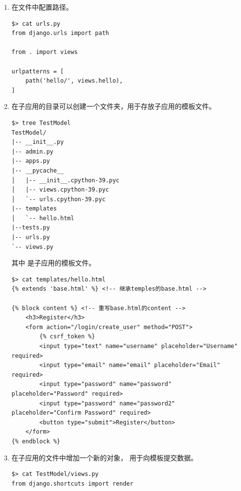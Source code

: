 \begin{enumerate}[label=\arabic*)]
\begin{lstlisting}[style=demostyle, numbers=none]
<body>
    <h2>美使馆</h2>
    {% block content %}
    {% endblock %}
</body> 

<footer>
    <small>&copy 2020 美使馆<a href="http://www.baidu.com">JJW</a></small>
</footer>

</html>
\end{lstlisting}

  \item 在文件中配置路径。
\begin{lstlisting}[style=demostyle,numbers=none]
$> cat urls.py
from django.urls import path
 
from . import views
 
urlpatterns = [
    path('hello/', views.hello),
]
\end{lstlisting}

\item 在\textcolor{YBXPurple}{子应用}的目录可以创建一个文件夹，用于存放子应用的模板文件。
\begin{lstlisting}[style=demostyle,numbers=none]
$> tree TestModel
TestModel/
|-- __init__.py
|-- admin.py
|-- apps.py
|-- __pycache__
│   |-- __init__.cpython-39.pyc
│   |-- views.cpython-39.pyc
│   `-- urls.cpython-39.pyc
|-- templates
│   `-- hello.html
|--tests.py
|-- urls.py
`-- views.py
\end{lstlisting}  

其中  是子应用的模板文件。
\begin{lstlisting}[style=demostyle,numbers=none]
$> cat templates/hello.html
{% extends 'base.html' %} <!-- 继承temples的base.html -->

{% block content %} <!-- 重写base.html的content -->
    <h3>Register</h3>
    <form action="/login/create_user" method="POST">
        {% csrf_token %}
        <input type="text" name="username" placeholder="Username" required>
        <input type="email" name="email" placeholder="Email" required>
        <input type="password" name="password" placeholder="Password" required>
        <input type="password" name="password2" placeholder="Confirm Password" required>
        <button type="submit">Register</button>
    </form>
{% endblock %}
\end{lstlisting}
  
  \item 在\textcolor{YBXPurple}{子应用}的文件中增加一个新的对象，
  用于向模板提交数据。
\begin{lstlisting}[style=demostyle,numbers=none]
$> cat TestModel/views.py
from django.shortcuts import render


\end{lstlisting}
\end{enumerate}
